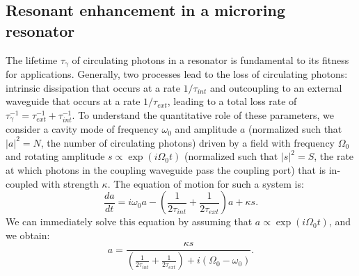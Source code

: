 \subsection{Resonant enhancement in a microring resonator}
 The lifetime $\tau_\gamma$ of circulating photons in a resonator is fundamental to its fitness for applications. Generally, two processes lead to the loss of circulating photons: intrinsic dissipation that occurs at a rate $1/\tau_{int}$ and outcoupling to an external waveguide that occurs at a rate $1/\tau_{ext}$, leading to a total loss rate of $\tau_\gamma^{-1}=\tau_{ext}^{-1}+\tau_{int}^{-1}$. To understand the quantitative role of these parameters, we consider a cavity mode of frequency $\omega_0$ and amplitude $a$ (normalized such that $|a|^2=N$, the number of circulating photons) driven by a field with frequency $\Omega_0$ and rotating amplitude $s\propto\exp(i\Omega_0 t)$ (normalized such that $|s|^2=S$, the rate at which photons in the coupling waveguide pass the coupling port) that is in-coupled with strength $\kappa$. The equation of motion for such a system is\cite{Haus1984}:
 \begin{equation}
 \frac{d a}{d t}=i\omega_0 a-\left(\frac{1}{2\tau_{int}}+\frac{1}{2\tau_{ext}}\right)a+\kappa s. \label{eq:coupledmotion}
 \end{equation}
 We can immediately solve this equation by assuming that $a\propto\exp(i\Omega_0 t)$, and we obtain:
 \begin{equation}
 a=\frac{\kappa s}{\left(\frac{1}{2\tau_{int}}+\frac{1}{2\tau_{ext}}\right)+i(\Omega_0-\omega_0)}. \label{eq:coupledsoln}
 \end{equation}
 
